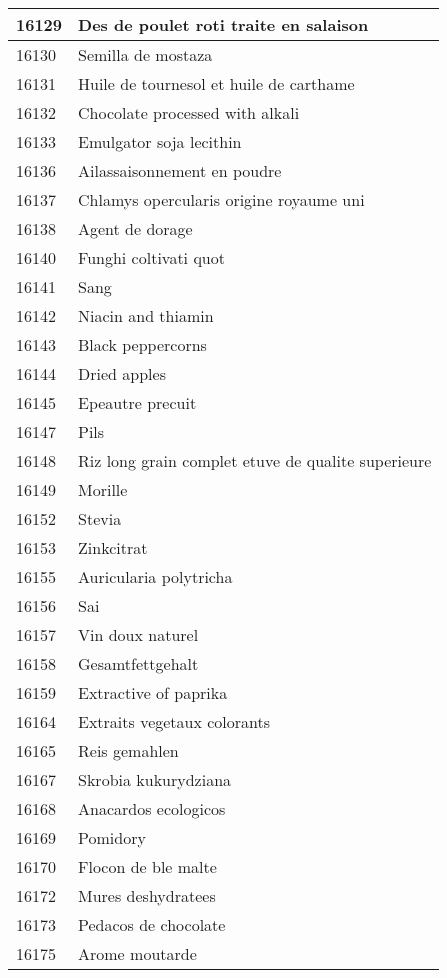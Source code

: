 \begin{longtable}{|l|l|}
16129 & Des de poulet roti traite en salaison \\ \hline 
16130 & Semilla de mostaza \\ \hline 
16131 & Huile de tournesol et huile de carthame \\ \hline 
16132 & Chocolate processed with alkali \\ \hline 
16133 & Emulgator soja lecithin \\ \hline 
16136 & Ailassaisonnement en poudre \\ \hline 
16137 & Chlamys opercularis origine royaume uni \\ \hline 
16138 & Agent de dorage \\ \hline 
16140 & Funghi coltivati quot \\ \hline 
16141 & Sang \\ \hline 
16142 & Niacin and thiamin \\ \hline 
16143 & Black peppercorns \\ \hline 
16144 & Dried apples \\ \hline 
16145 & Epeautre precuit \\ \hline 
16147 & Pils \\ \hline 
16148 & Riz long grain complet etuve de qualite superieure \\ \hline 
16149 & Morille \\ \hline 
16152 & Stevia \\ \hline 
16153 & Zinkcitrat \\ \hline 
16155 & Auricularia polytricha \\ \hline 
16156 & Sai \\ \hline 
16157 & Vin doux naturel \\ \hline 
16158 & Gesamtfettgehalt \\ \hline 
16159 & Extractive of paprika \\ \hline 
16164 & Extraits vegetaux colorants \\ \hline 
16165 & Reis gemahlen \\ \hline 
16167 & Skrobia kukurydziana \\ \hline 
16168 & Anacardos ecologicos \\ \hline 
16169 & Pomidory \\ \hline 
16170 & Flocon de ble malte \\ \hline 
16172 & Mures deshydratees \\ \hline 
16173 & Pedacos de chocolate \\ \hline 
16175 & Arome moutarde \\ \hline 

\end{longtable}
